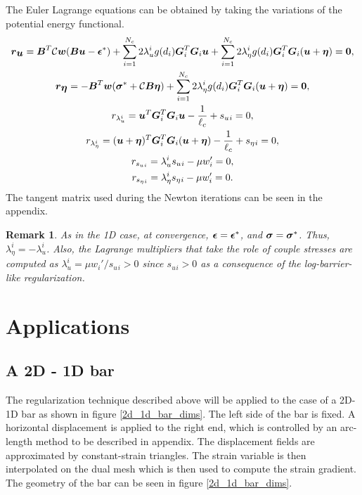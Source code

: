 \documentclass[12pt]{elsarticle}
\newtheorem*{remark}{Remark}
\begin{document}
The Euler Lagrange equations can be obtained by taking the variations of the potential energy functional.
\begin{gather}
	\mbox{\boldmath $r$}_{\mbox{\boldmath $u$}} = \mbox{\boldmath $B$}^T \mathcal{C} \mbox{\boldmath $w$}(\mbox{\boldmath $B$} \mbox{\boldmath $u$} - \mbox{\boldmath $\epsilon$}^*) + \sum_{i=1}^{N_c} 2 \lambda_u^ i  g(d_i) \mbox{\boldmath $G$}_i ^T \mbox{\boldmath $G$}_i \mbox{\boldmath $u$}
	+\sum_{i=1}^{N_c} 2 \lambda_\eta^ i  g(d_i) \mbox{\boldmath $G$}_i ^T \mbox{\boldmath $G$}_i (\mbox{\boldmath $u$}+\mbox{\boldmath $\eta$}) = \bf0, \\
	\mbox{\boldmath $r$}_{\mbox{\boldmath $\eta$}} = -\mbox{\boldmath $B$}^T \mbox{\boldmath $w$}(\mbox{\boldmath $\sigma$}^*+ \mathcal{C} \mbox{\boldmath $B$} \mbox{\boldmath $\eta$} ) 
	+\sum_{i=1}^{N_c} 2 \lambda_\eta^ i  g(d_i) \mbox{\boldmath $G$}_i ^T \mbox{\boldmath $G$}_i (\mbox{\boldmath $u$}+\mbox{\boldmath $\eta$}) = \bf0, \\
	r_{\lambda_u^ i} = \mbox{\boldmath $u$} ^T \mbox{\boldmath $G$}_i ^T \mbox{\boldmath $G$}_i \mbox{\boldmath $u$} - \frac{1}{\ell_c} +  s_u{_i} = 0, \\
	r_{\lambda_\eta^ i} = (\mbox{\boldmath $u$}+\mbox{\boldmath $\eta$}) ^T \mbox{\boldmath $G$}_i ^T \mbox{\boldmath $G$}_i (\mbox{\boldmath $u$}+\mbox{\boldmath $\eta$}) - \frac{1}{\ell_c} +  s_\eta{_i} = 0, \\ 
	r_{s_u{_i}} = \lambda_u^ i s_u{_i} - \mu w_i'   = 0, \\
	r_{s_\eta{_i}} = \lambda_\eta^ i s_\eta{_i} - \mu w_i'   = 0.
\end{gather}
The tangent matrix used during the Newton iterations can be seen in the appendix.

\begin{remark}
As in the 1D case, at convergence, $\mbox{\boldmath $\epsilon$} = \mbox{\boldmath $\epsilon$}^*$, and $\mbox{\boldmath $\sigma$} = \mbox{\boldmath $\sigma$}^*$. Thus, $\lambda_\eta^ i = -\lambda_u^ i$. Also, the Lagrange multipliers that take the role of couple stresses are computed as $\lambda_u^ i  =  \mu w_i'/ s_u{_i} >0$ since $s_u{_i} >0$ as a consequence of the log-barrier-like regularization.
\end{remark}

\section{Applications}
\subsection{A 2D - 1D bar}
The regularization technique described above will be applied to the case of a 2D-1D bar as shown in figure \ref{2d_1d_bar_dims}. The left side of the bar is fixed. A horizontal displacement is applied to the right end, which is controlled by an arc-length method to be described in appendix. The displacement fields are approximated by constant-strain triangles. The strain variable is then interpolated on the dual mesh which is then used to compute the strain gradient. The geometry of the bar can be seen in figure \ref{2d_1d_bar_dims}.
\end{document}
